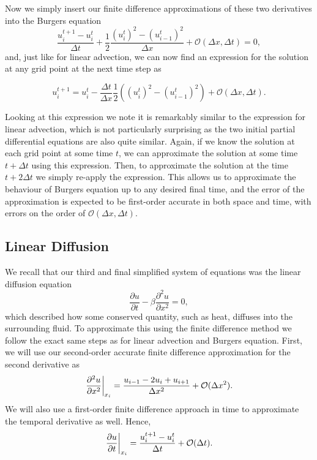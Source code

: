 Now we simply insert our finite difference approximations of these two derivatives into the Burgers equation
\begin{equation}
	\frac{u_i^{t+1} - u_{i}^t}{\Delta t} +  \frac{1}{2}\frac{(u_i^t)^2 - (u_{i-1}^t)^2}{\Delta x} + \mathcal{O}(\Delta x, \Delta t) = 0,
\end{equation}
and, just like for linear advection, we can now find an expression for the solution at any grid point at the next time step as
\begin{eqBox}
\begin{equation}
	u_i^{t+1} = u_{i}^t - \frac{\Delta t}{\Delta x} \frac{1}{2}\left( \left(u_i^t \right)^2 - \left( u_{i-1}^t \right)^2 \right) + \mathcal{O}(\Delta x, \Delta t).
\end{equation}
\end{eqBox}
Looking at this expression we note it is remarkably similar to the expression for linear advection, which is not particularly surprising as the two initial partial differential equations are also quite similar. Again, if we know the solution at each grid point at some time $t$, we can approximate the solution at some time $t+\Delta t$ using this expression. Then, to approximate the solution at the time $t+2\Delta t$ we simply re-apply the expression. This allows us to approximate the behaviour of Burgers equation up to any desired final time, and the error of the approximation is expected to be first-order accurate in both space and time, with errors on the order of $\mathcal{O}(\Delta x, \Delta t)$.

\subsection{Linear Diffusion}
We recall that our third and final simplified system of equations was the linear diffusion equation
\begin{equation}
\frac{\partial u}{\partial t} - \beta \frac{\partial^2 u}{\partial x^2} = 0,
\end{equation}
which described how some conserved quantity, such as heat, diffuses into the surrounding fluid. To approximate this using the finite difference method we follow the exact same steps as for linear advection and Burgers equation. First, we will use our second-order accurate finite difference approximation for the second derivative as
\begin{equation}
	\left.\frac{\partial^2 u}{\partial x^2}\right\rvert_{x_i}^{} = \frac{u_{i-1} - 2u_i + u_{i+1}}{\Delta x^2} + \mathcal{O}(\Delta x^2).
\end{equation}
We will also use a first-order finite difference approach in time to approximate the temporal derivative as well. Hence,
\begin{equation}
	\left.\frac{\partial u}{\partial t}\right\rvert_{x_i}^{} = \frac{u_i^{t+1} - u_{i}^t}{\Delta t} + \mathcal{O}(\Delta t).
\end{equation}

